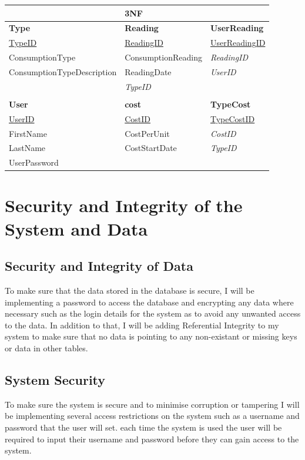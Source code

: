 \begin{center}
	\begin{tabular}{|p{5cm}|p{4cm}|p{3.5cm}|}
		\hline
		 & \textbf{3NF} & \\ \hline
		\textbf{Type} & \textbf{Reading} & \textbf{UserReading} \\ \hline
		\underline{TypeID} & \underline{ReadingID} & \underline{UserReadingID} \\ \hline
		ConsumptionType & ConsumptionReading & \emph{ReadingID} \\ \hline
		ConsumptionTypeDescription & ReadingDate & \emph{UserID} \\ \hline
		 & \emph{TypeID} & \\ \hline
		 & & \\ \hline
		\textbf{User} & \textbf{cost} & \textbf{TypeCost} \\ \hline
		\underline{UserID} & \underline{CostID} & \underline{TypeCostID} \\ \hline
		FirstName & CostPerUnit & \emph{CostID} \\ \hline
		LastName & CostStartDate & \emph{TypeID} \\ \hline
		UserPassword & & \\ \hline
	\end{tabular}
\end{center}

\section{Security and Integrity of the System and Data}

\subsection{Security and Integrity of Data}
To make sure that the data stored in the database is secure, I will be implementing a password to access the database and encrypting any data where necessary such as the login details for the system as to avoid any unwanted access to the data. In addition to that, I will be adding Referential Integrity to my system to make sure that no data is pointing to any non-existant or missing keys or data in other tables.

\subsection{System Security}
To make sure the system is secure and to minimise corruption or tampering I will be implementing several access restrictions on the system such as a username and password that the user will set. each time the system is used the user will be required to input their username and password before they can gain access to the system.

